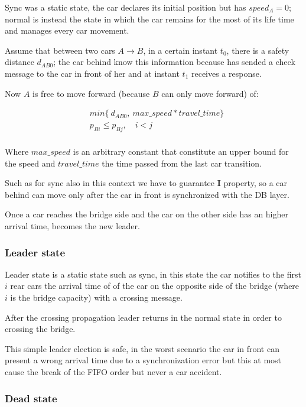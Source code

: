 Sync was a static state, the car declares its initial position but has $speed_A = 0$;
normal is instead the state in which the car remains for the most of its life time and 
manages every car movement.

Assume that between two cars $A \rightarrow B$, in a certain instant $t_0$, 
there is a safety distance $d_{AB0}$; 
the car behind know this information because has sended a check message to the car 
in front of her and at instant $t_1$ receives a response.

Now $A$ is free to move forward (because $B$ can only move forward) of:

\begin{equation}\begin{split}
    & min\{\ d_{AB0},\ max\_speed * travel\_time \} \\
    & p_{Bi} \leq p_{Bj},\quad i < j \\
\end{split}\end{equation}    

Where $max\_speed$ is an arbitrary constant that constitute an upper bound for the speed 
and $travel\_time$ the time passed from the last car transition. 

Such as for sync also in this context we have to guarantee \textbf{I} property, so 
a car behind can move only after the car in front is synchronized with the DB layer.

Once a car reaches the bridge side and the car on the other side has an 
higher arrival time, becomes the new leader.


\subsubsection{Leader state}

Leader state is a static state such as sync, in this state the car notifies to 
the first $i$ rear cars the arrival time of of the car on the opposite side of the bridge 
(where $i$ is the bridge capacity) with a crossing message.

After the crossing propagation leader returns in the normal state in order to 
crossing the bridge. 

This simple leader election is safe, in the worst scenario 
the car in front can present a wrong arrival time due to a synchronization error 
but this at most cause the break of the FIFO order but never a car accident.


\subsubsection{Dead state}

